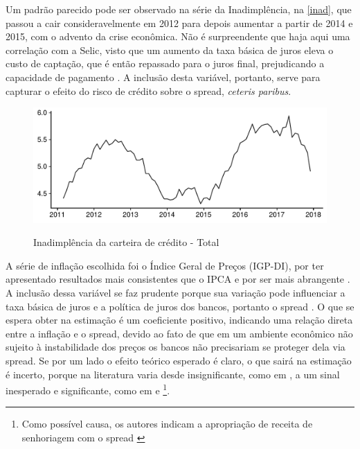 \documentclass[a4paper,
               article,
               12pt,
               openany,
               oneside,
               english,
               brazil]{abntex2}
\numberwithin{equation}{section}
\begin{document}
    Um padrão parecido pode ser observado na série da Inadimplência, na \autoref{inad}, que passou a cair consideravelmente em 2012 para depois aumentar a partir de 2014 e 2015, com o advento da crise econômica. Não é surpreendente que haja aqui uma correlação com a Selic, visto que um aumento da taxa básica de juros eleva o custo de captação, que é então repassado para o juros final, prejudicando a capacidade de pagamento \cite[p.~390]{oliveira2007}. A inclusão desta variável, portanto, serve para capturar o efeito do risco de crédito sobre o spread, \textit{ceteris paribus}.

    \begin{figure}[t]
        \centering
        \caption{Inadimplência da carteira de crédito - Total}
        \includegraphics[width = \textwidth, scale=0.75]{Inadimplencia.pdf}
        \label{inad}
    \end{figure}

    A série de inflação escolhida foi o Índice Geral de Preços (IGP-DI), por ter apresentado resultados mais consistentes que o IPCA \cite[p.~66]{rocha09} e por ser mais abrangente \cite[p.~21]{afanasieff02}. A inclusão dessa variável se faz prudente porque sua variação pode influenciar a taxa básica de juros e a política de juros dos bancos, portanto o spread \cite[p.~14]{bignotto06}. O que se espera obter na estimação é um coeficiente positivo, indicando uma relação direta entre a inflação e o spread, devido ao fato de que em um ambiente econômico não sujeito à instabilidade dos preços os bancos não precisariam se proteger dela via spread. Se por um lado o efeito teórico esperado é claro, o que sairá na estimação é incerto, porque na literatura varia desde insignificante, como em \textcite{oreiro}, a um sinal inesperado e significante, como em \textcite{bignotto06} e \textcite{afanasieff02}\footnote{Como possível causa, os autores indicam a apropriação de receita de senhoriagem com o spread \cite[p.~25]{afanasieff02}}.
    
\end{document}
